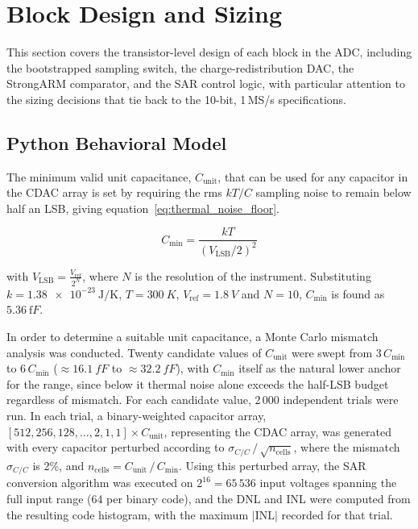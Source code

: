 \documentclass[12pt, a4paper]{article}
\begin{document}
\section{Block Design and Sizing}
\label{section:block_design}
This section covers the transistor-level design of each block in the ADC, including the bootstrapped sampling switch, the charge-redistribution DAC, the StrongARM comparator, and the SAR control logic, with particular attention to the sizing decisions that tie back to the 10-bit, 1\,MS/s specifications.

\subsection{Python Behavioral Model}
\label{subsection:behavioral_model}

The minimum valid unit capacitance, $C_\mathrm{unit}$, that can be used for any capacitor in the CDAC array is set by requiring the rms $kT/C$ sampling noise to remain below half an LSB, giving equation~\ref{eq:thermal_noise_floor}.

\begin{equation}
    C_\mathrm{min} = \frac{kT}{(V_\mathrm{LSB}/2)^2} \label{eq:thermal_noise_floor}
\end{equation}

with $V_\mathrm{LSB} = \frac{V_\mathrm{ref}}{2^N}$, where $N$ is the resolution of the instrument. Substituting $k = \qty{1.38e-23}{\joule\per\kelvin}$, $T = \qty{300}{K}$, $V_\mathrm{ref} = \qty{1.8}{V}$ and $N=10$,
$C_\mathrm{min} $ is found as $\qty{5.36}{\femto F}$.

In order to determine a suitable unit capacitance, a Monte Carlo mismatch analysis was conducted. Twenty candidate values of $C_\mathrm{unit}$ were swept from $3\,C_\mathrm{min}$ to $6\,C_\mathrm{min}$ ($\approx\qty{16.1}{fF}$ to $\approx\qty{32.2}{fF}$), with $C_\mathrm{min}$ itself as the natural lower anchor for the range, since below it thermal noise alone exceeds the half-LSB budget regardless of mismatch. For each candidate value, 2\,000 independent trials were run. In each trial, a binary-weighted capacitor array,
$[512, 256, 128, ..., 2, 1, 1] \times C_\mathrm{unit}$, representing the CDAC array, was generated with every capacitor perturbed according to $\sigma_{C/C} \, / \, \sqrt{n_\mathrm{cells}}$,
where the mismatch $\sigma_{C/C}$ is 2\%, and $n_\mathrm{cells} = C_\mathrm{unit} \, / \, C_\mathrm{min}$. Using this perturbed array, the SAR conversion algorithm was executed on $2^{16} = 65\,536$
input voltages spanning the full input range (64 per binary code), and the DNL and INL were computed from the resulting code histogram, with the maximum $|\mathrm{INL}|$ recorded for that trial.
\end{document}
